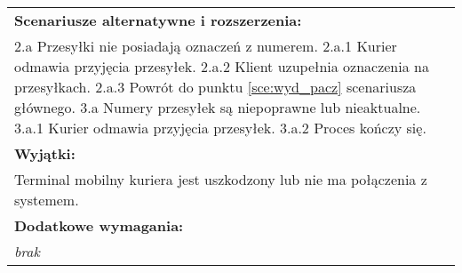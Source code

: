 \begin{center}
\begin{longtable}[h]{|p{1.6cm}|p{13.5cm}|}
{} \\ \hline
\multicolumn{2}{|p{15.1cm}|}{\textbf{Scenariusze alternatywne i rozszerzenia:}} \\
\multicolumn{2}{|p{15.1cm}|}{
2.a Przesyłki nie posiadają oznaczeń z numerem. \newline
2.a.1 Kurier odmawia przyjęcia przesyłek. \newline
2.a.2 Klient uzupełnia oznaczenia na przesyłkach. \newline
2.a.3 Powrót do punktu \ref{sce:wyd_pacz} scenariusza głównego. \newline
\newline
3.a Numery przesyłek są niepoprawne lub nieaktualne. \newline
3.a.1 Kurier odmawia przyjęcia przesyłek. \newline
3.a.2 Proces kończy się.
} \\ \hline
\multicolumn{2}{|p{15.1cm}|}{\textbf{Wyjątki:}} \\
\multicolumn{2}{|p{15.1cm}|}{
Terminal mobilny kuriera jest uszkodzony lub nie ma połączenia z systemem.
} \\ \hline
\multicolumn{2}{|p{15.1cm}|}{\textbf{Dodatkowe wymagania:}} \\
\multicolumn{2}{|p{15.1cm}|}{\textit{brak}
} \\
\hline
\end{longtable}
\end{center}

